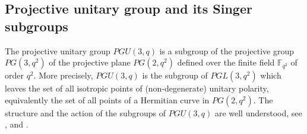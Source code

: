 \documentclass[9pt]{article}
\theoremstyle{plain}
\begin{document}
\subsection{Projective unitary group and its Singer subgroups}\label{singergroup}
The projective unitary group $PGU(3,q)$ is a subgroup of the projective group $PG(3,q^2)$ of the projective plane $PG(2,q^2)$ defined over the finite field $\mathbb{F}_{q^2}$ of order $q^2$. More precisely, $PGU(3,q)$ is the subgroup of $PGL(3,q^2)$ which leaves the set of all isotropic points of (non-degenerate) unitary polarity, equivalently the set of all points of a Hermitian curve in $PG(2,q^2)$.
The structure and the action of the subgroups of $PGU(3,q)$ are well understood, see \cite{har,hoffer1972,oli, mi}, and  \cite[Theorem A.10]{HKT}.
\end{document}
